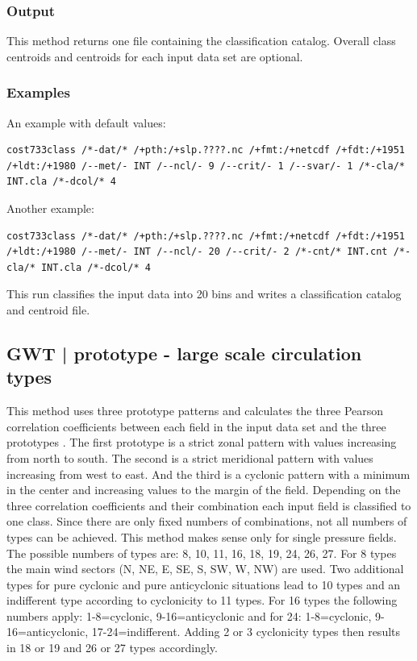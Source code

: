 \documentclass[12pt, oneside, a4paper, headsepline, plainheadsepline]{scrbook}
\begin{document}
\subsubsection*{Output}
This method returns one file containing the classification catalog. 
Overall class centroids and centroids for each input data set are optional.

\subsubsection*{Examples}
An example with default values:
\begin{lstlisting}
cost733class /*-dat/* /+pth:/+slp.????.nc /+fmt:/+netcdf /+fdt:/+1951 /+ldt:/+1980 /--met/- INT /--ncl/- 9 /--crit/- 1 /--svar/- 1 /*-cla/* INT.cla /*-dcol/* 4 
\end{lstlisting}
Another example:
\begin{lstlisting}
cost733class /*-dat/* /+pth:/+slp.????.nc /+fmt:/+netcdf /+fdt:/+1951 /+ldt:/+1980 /--met/- INT /--ncl/- 20 /--crit/- 2 /*-cnt/* INT.cnt /*-cla/* INT.cla /*-dcol/* 4 
\end{lstlisting}
This run classifies the input data into 20 bins and writes a classification catalog and centroid file.

\subsection{GWT | prototype - large scale circulation types}
\label{met:GWT}

This method uses three prototype patterns and calculates the three Pearson correlation coefficients between
each field in the input data set and the three prototypes \citep{Beck2007}. The first prototype is a strict zonal pattern with 
values increasing from north to south. The second is a strict meridional pattern with values increasing from west
to east. And the third is a cyclonic pattern with a minimum in the center and increasing values to the margin 
of the field. Depending on the three correlation coefficients and their combination each input field is 
classified to one class.
Since there are only fixed numbers of combinations, not all numbers of types can be achieved.
This method makes sense only for single pressure fields. The possible numbers of types are: 8, 10, 11, 16, 18, 19, 24, 26, 27.
For 8 types the main wind sectors (N, NE, E, SE, S, SW, W, NW) are used. Two additional types for pure cyclonic and pure 
anticyclonic situations lead to 10 types and an indifferent type according to cyclonicity to 11 types.
For 16 types the following numbers apply: 1-8=cyclonic, 9-16=anticyclonic 
and for 24:  1-8=cyclonic, 9-16=anticyclonic, 17-24=indifferent. Adding 2 or 3 cyclonicity types then results in
18 or 19 and 26 or 27 types accordingly.
\end{document}
